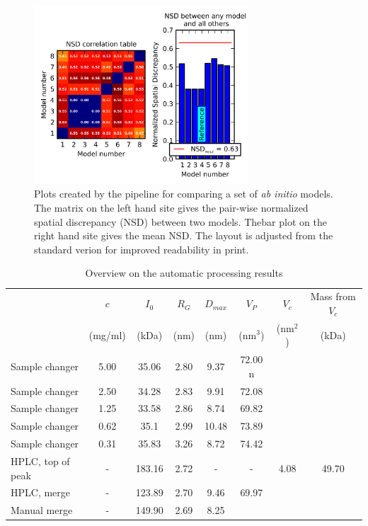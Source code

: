 \documentclass[preprint,pdf]{iucr}              %
\begin{document}
\begin{figure}
\centering
\includegraphics[width=8cm]{nsd.png}%
\caption{Plots created by the pipeline for comparing a set of \textit{ab initio} models. The matrix on the left hand site gives the pair-wise normalized spatial discrepancy (NSD) between two models. Thebar plot on the right hand site gives the mean NSD. The layout is adjusted from the standard verion for improved readability in print.}
\label{fgr:nsd}
\end{figure}

\begin{table}
\begin{tabular}{ l c | c c c c c c }
   & $c$  & $I_{0}$  & $R_{G}$ & $D_{max}$ & $V_{P}$ & $V_{c}$ & Mass from $V_{c}$\\
	 &  (mg/ml) & (kDa) & (nm)&  (nm)&  (nm$^{3}$) & (nm$^{2}$) & (kDa)\\
\hline 
Sample changer & 5.00  & 35.06 & 2.80 & 9.37  & 72.00 n& &  \\
Sample changer & 2.50  & 34.28 & 2.83  & 9.91  & 72.08 & &  \\
Sample changer & 1.25 & 33.58& 2.86  & 8.74  & 69.82 & &  \\
Sample changer & 0.62  & 35.1& 2.99  & 10.48 & 73.89 & &  \\
Sample changer & 0.31 & 35.83  & 3.26  & 8.72  & 74.42& &  \\
HPLC, top of peak & - & 183.16 & 2.72  & -  & - & 4.08 & 49.70 \\
HPLC, merge & - & 123.89 & 2.70  & 9.46 & 69.97 & &  \\
Manual merge & - &  149.90 & 2.69 & 8.25 & & &  \\
\end{tabular}
\caption{Overview on the automatic processing results }
\label{tbl:results}
\end{table}
\end{document}
